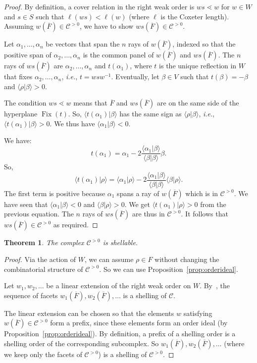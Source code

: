 \documentclass[11pt]{article}
\newtheorem{theo}{Theorem}[section]
\theoremstyle{definition}
\DeclareMathOperator{\Fix}{Fix}
\newcommand{\CC}{\mathcal{C}}
\newcommand{\CCP}{\mathcal{C}^{>0}}
\begin{document}
\begin{proof}
    By definition, a cover relation in the right weak order is $ws \lessdot w$ for $w\in W$ and $s\in S$ such that
    $\ell(ws) < \ell(w)$ (where $\ell$ is the Coxeter length).  Assuming $w(\overline{F}) \in \CCP$, we have to show $ws(\overline{F}) \in \CCP$.

    Let $\alpha_1,\dots,\alpha_n$ be vectors that span the $n$ rays of $w(\overline{F})$, indexed so that the positive span of $\alpha_2,\dots,\alpha_n$ is the common panel of $w(\overline{F})$ and $ws(\overline{F})$.  The $n$ rays of $ws(\overline{F})$ are $\alpha_2,\dots,\alpha_n$ and $t(\alpha_1)$, where $t$ is the unique reflection in $W$ that fixes $\alpha_2,\dots,\alpha_n$, {\it i.e.}, $t = ws w^{-1}$.  Eventually, let $\beta \in V$ such that $t(\beta) = -\beta$ and $\langle \rho | \beta \rangle > 0$.
    
    The condition $ws \lessdot w$ means that $\overline{F}$ and $ws(\overline{F})$ are on the same side of the hyperplane $\Fix(t)$.  So, $\langle t(\alpha_1) | \beta \rangle$ has the same sign as $\langle \rho | \beta \rangle$, {\it i.e.},  $\langle t(\alpha_1) | \beta \rangle >0$.   We thus have $\langle \alpha_1 | \beta \rangle <0$.

    We have:
    \[
        t(\alpha_1)
            =
        \alpha_1 - 2 \frac{\langle\alpha_1|\beta\rangle}{\langle\beta|\beta\rangle} \beta.
    \]
    So, 
    \[
        \langle t(\alpha_1) |\rho \rangle
            =
        \langle\alpha_1|\rho\rangle - 2 \frac{\langle\alpha_1|\beta\rangle}{\langle\beta|\beta\rangle} \langle\beta|\rho\rangle.
    \]
    The first term is positive because $\alpha_1$ spans a ray of $w(\overline{F})$ which is in $\CCP$. We have seen that $\langle\alpha_1|\beta\rangle <0$ and $\langle\beta|\rho\rangle >0$.  We get $\langle t(\alpha_1) |\rho \rangle >0$ from the previous equation.  The $n$ rays of $ws(\overline{F})$ are thus in $\CCP$.  It follows that $ws(\overline{F}) \in \CCP$ as required.
\end{proof}

\begin{theo} \label{theo:shelling}
    The complex $\CCP$ is shellable. 
\end{theo}

\begin{proof}
    Via the action of $W$, we can assume $\rho\in F$ without changing the combinatorial structure of $\CCP$. So we can use Proposition~\ref{prop:orderideal}.  

    Let $w_1,w_2,\dots$ be a linear extension of the right weak order on $W$. By~\cite[Theorem~2.1]{bjorner}, the sequence of facets $w_1(\overline{F}), w_2(\overline{F}), \dots$ is a shelling of $\CC$.
    
    The linear extension can be chosen so that the elements $w$ satisfying $w(\overline{F}) \in \CCP$ form a prefix, since these elements form an order ideal (by Proposition~\ref{prop:orderideal}).  By definition, a prefix of a shelling order is a shelling order of the corresponding subcomplex.  So $w_1(\overline{F}), w_2(\overline{F}), \dots$ (where we keep only the facets of $\CCP$) is a shelling of $\CCP$.
\end{proof}
\end{document}
